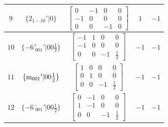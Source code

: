 \documentclass[fleqn,8pt]{jsarticle}
\begin{document}
\begin{longtable}{ccccc}
$ 9 $ & $ \{2{}_{1-10}{}'|0\} $ & $ \begin{bmatrix} 0 & -1 & 0 & 0 \\ -1 & 0 & 0 & 0 \\ 0 & 0 & -1 & 0 \end{bmatrix} $ & $ 1 $ & $ -1 $ \\ \hline
$ 10 $ & $ \{-6^{+}_{\,\,001}{}'|0 0 \frac{1}{2}\} $ & $ \begin{bmatrix} -1 & 1 & 0 & 0 \\ -1 & 0 & 0 & 0 \\ 0 & 0 & -1 & \frac{1}{2} \end{bmatrix} $ & $ -1 $ & $ -1 $ \\ \hline
$ 11 $ & $ \{{\rm m}_{001}{}'|0 0 \frac{1}{2}\} $ & $ \begin{bmatrix} 1 & 0 & 0 & 0 \\ 0 & 1 & 0 & 0 \\ 0 & 0 & -1 & \frac{1}{2} \end{bmatrix} $ & $ -1 $ & $ -1 $ \\ \hline
$ 12 $ & $ \{-6^{-}_{\,\,001}{}'|0 0 \frac{1}{2}\} $ & $ \begin{bmatrix} 0 & -1 & 0 & 0 \\ 1 & -1 & 0 & 0 \\ 0 & 0 & -1 & \frac{1}{2} \end{bmatrix} $ & $ -1 $ & $ -1 $ \\
\end{longtable}
\end{document}
